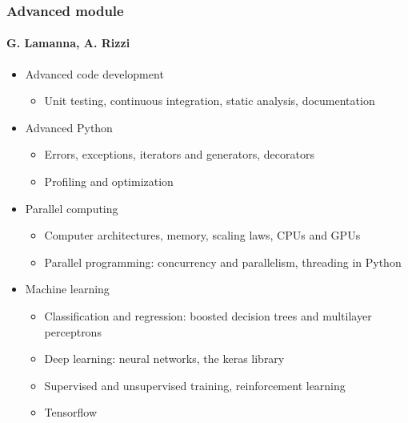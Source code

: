 \documentclass[9pt]{beamer}
\begin{document}
\begin{frame}
  \frametitle{Advanced module}
  \framesubtitle{G. Lamanna, A. Rizzi}
  \begin{itemize}
  \item Advanced code development
    \begin{itemize}
    \item Unit testing, continuous integration, static analysis, documentation
    \end{itemize}
  \item Advanced Python
    \begin{itemize}
    \item Errors, exceptions, iterators and generators, decorators
    \item Profiling and optimization
    \end{itemize}
  \item Parallel computing
    \begin{itemize}
    \item Computer architectures, memory, scaling laws, CPUs and GPUs
    \item Parallel programming: concurrency and parallelism, threading in Python
    \end{itemize}
  \item Machine learning
    \begin{itemize}
    \item Classification and regression: boosted decision trees and
      multilayer perceptrons
    \item Deep learning: neural networks, the keras library
    \item Supervised and unsupervised training, reinforcement learning
    \item Tensorflow
    \end{itemize}
  \end{itemize}
\end{frame}
\end{document}
